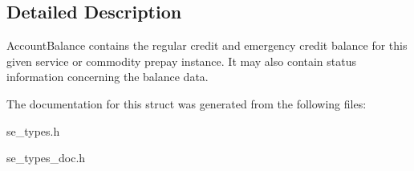 \subsection{Detailed Description}
Account\+Balance contains the regular credit and emergency credit balance for this given service or commodity prepay instance. It may also contain status information concerning the balance data. 

The documentation for this struct was generated from the following files\+:\begin{DoxyCompactItemize}
\item 
se\+\_\+types.\+h\item 
se\+\_\+types\+\_\+doc.\+h\end{DoxyCompactItemize}

